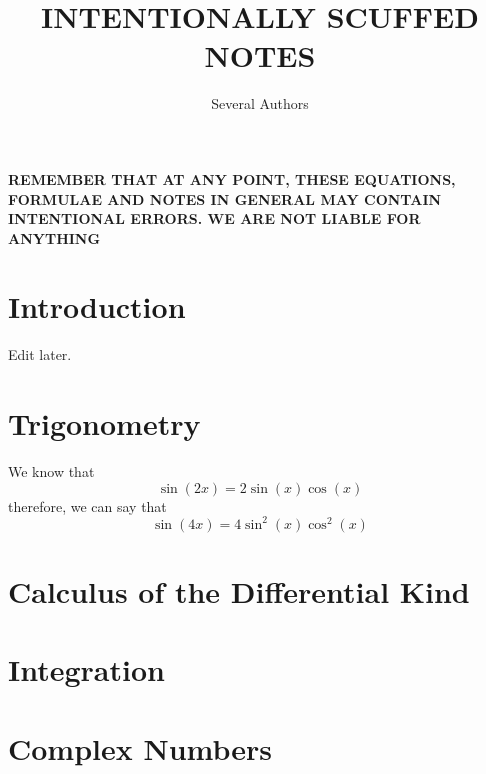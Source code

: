 \documentclass[a4paper]{article}
\newcommand{\sectionSpace}{\vspace{1em}} %
\begin{document}
\title{INTENTIONALLY SCUFFED NOTES}
\author{Several Authors}
\maketitle
\newpage



\begin{center}
    \Large 
    \textbf{
        REMEMBER THAT AT ANY POINT, THESE EQUATIONS, FORMULAE AND NOTES IN GENERAL MAY CONTAIN INTENTIONAL ERRORS. WE ARE NOT LIABLE FOR ANYTHING} 
\end{center}

\sectionSpace
\section{Introduction}
    Edit later.



\sectionSpace
\section{Trigonometry}
    We know that
    $$\sin(2x) = 2\sin(x)\cos(x)$$
    therefore, we can say that
    $$\sin(4x) = 4\sin^2(x)\cos^2(x)$$


\sectionSpace
\section{Calculus of the Differential Kind}

\sectionSpace
\section{Integration}


\sectionSpace
\section{Complex Numbers}
\end{document}
